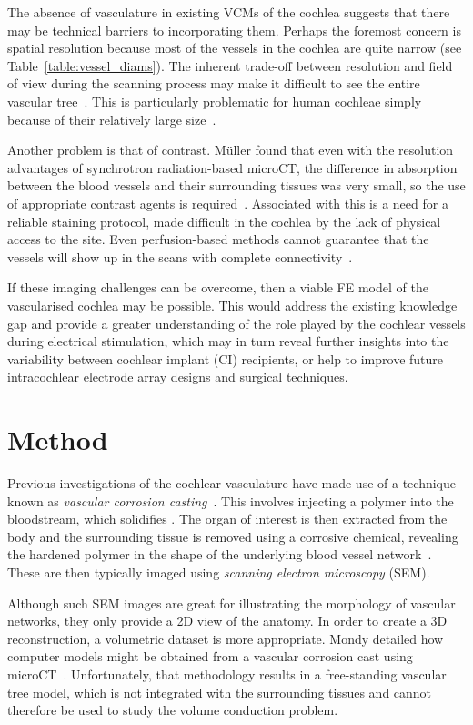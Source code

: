 The absence of vasculature in existing VCMs of the cochlea suggests that there
may be technical barriers to incorporating them. Perhaps the foremost concern is
spatial resolution because most of the vessels in the cochlea are quite narrow
(see Table~\ref{table:vessel_diams}). The inherent trade-off between resolution
and field of view during the scanning process may make it difficult to
see the entire vascular tree~\cite{muller2006blood,mondy2009thesis}. This is
particularly problematic for human cochleae simply because of their relatively
large size~\cite{thorne1999}.

Another problem is that of contrast. M{\"u}ller found that even with the
resolution advantages of synchrotron radiation-based microCT, the difference in
absorption between the blood vessels and their surrounding tissues was very
small, so the use of appropriate contrast agents is
required~\cite{muller2006blood}. Associated with this is a need for a reliable
staining protocol, made difficult in the cochlea by the lack of physical access
to the site. Even perfusion-based methods cannot guarantee that the vessels will
show up in the scans with complete connectivity~\cite[Fig.~5]{muller2006blood}.

If these imaging challenges can be overcome, then a viable FE model of the
vascularised cochlea may be possible. This would address the existing knowledge
gap and provide a greater understanding of the role played by the cochlear
vessels during electrical stimulation, which may in turn reveal further insights
into the variability between cochlear implant (CI) recipients, or help to
improve future intracochlear electrode array designs and surgical techniques.

\section{Method}

Previous investigations of the cochlear vasculature have made use of a technique
known as \emph{vascular corrosion casting}~\cite{shatari1994,mudry2009}. This
involves injecting a polymer into the bloodstream, which solidifies \invivo{}.
The organ of interest is then extracted from the body and the surrounding tissue
is removed using a corrosive chemical, revealing the hardened polymer in the
shape of the underlying blood vessel network~\cite{hossler2001}. These are then
typically imaged using \emph{scanning electron microscopy} (SEM).

Although such SEM images are great for illustrating the morphology of vascular
networks, they only provide a 2D view of the anatomy. In order to create a 3D
reconstruction, a volumetric dataset is more appropriate. Mondy detailed how
computer models might be obtained from a vascular corrosion cast using
microCT~\cite{mondy2009paper,mondy2009thesis}. Unfortunately, that methodology
results in a free-standing vascular tree model, which is not integrated with the
surrounding tissues and cannot therefore be used to study the volume conduction
problem.

